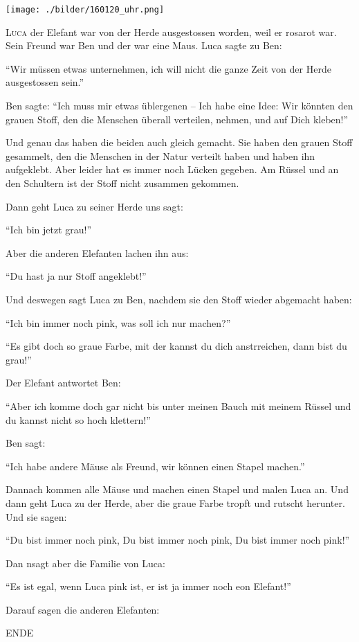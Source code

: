 \thispagestyle{empty}
\begin{center}
\texttt{[image: ./bilder/160120\_uhr.png]}
\end{center}
\vskip 2cm
{\Huge\color{farbe}\hfill{}}
\newpage
\lettrine[lines=2, lhang=.2, loversize=.25, lraise=0.05, findent=0.1em,
nindent=0em]{L}{uca} der Elefant war von der Herde ausgestossen worden, weil er rosarot war. Sein Freund war Ben und der war eine Maus. Luca sagte zu Ben:

\enquote{Wir müssen etwas unternehmen, ich will nicht die ganze Zeit von der Herde ausgestossen sein.}

Ben sagte: \enquote{Ich muss mir etwas üblergenen -- Ich habe eine Idee: Wir könnten den grauen Stoff, den die Menschen überall verteilen, nehmen, und auf Dich kleben!}

Und genau das haben die beiden auch gleich gemacht. Sie haben den grauen Stoff gesammelt, den die Menschen in der Natur verteilt haben und haben ihn aufgeklebt. Aber leider hat es immer noch Lücken gegeben. Am Rüssel und an den Schultern ist der Stoff nicht zusammen gekommen. 

Dann geht Luca zu seiner Herde uns sagt: 

\enquote{Ich bin jetzt grau!}

Aber die anderen Elefanten lachen ihn aus: 

\enquote{Du hast ja nur Stoff angeklebt!}

Und deswegen sagt Luca zu Ben, nachdem sie den Stoff wieder abgemacht haben:

\enquote{Ich bin immer noch pink, was soll ich nur machen?}

\enquote{Es gibt doch so graue Farbe, mit der kannst du dich anstrreichen, dann bist du grau!}

Der Elefant antwortet Ben:

\enquote{Aber ich komme doch gar nicht bis unter meinen Bauch mit meinem Rüssel und du kannst nicht so hoch klettern!}

Ben sagt:

\enquote{Ich habe andere Mäuse als Freund, wir können einen Stapel machen.}

Dannach kommen alle Mäuse und machen einen Stapel und malen Luca an. Und dann geht Luca zu der Herde, aber die graue Farbe tropft und rutscht herunter. Und sie sagen:

\enquote{Du bist immer noch pink, Du bist immer noch pink, Du bist immer noch pink!}

Dan nsagt aber die Familie von Luca:

\enquote{Es ist egal, wenn Luca pink ist, er ist ja immer noch eon Elefant!}

Darauf sagen die anderen Elefanten:


ENDE

